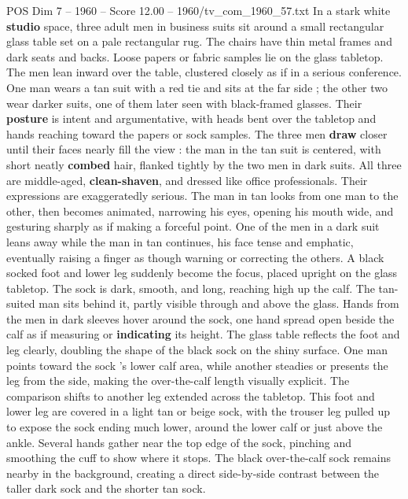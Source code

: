 \begin{textsample}{POS Dim 7 – 1960 – Score 12.00 – 1960/tv\_com\_1960\_57.txt}  \label{ex:f7_pos_026}
In a stark white \textbf{studio} space, three adult men in business suits sit around a small rectangular glass table set on a pale rectangular rug.
The chairs have thin metal frames and dark seats and backs.
Loose papers or fabric samples lie on the glass tabletop.
The men lean inward over the table, clustered closely as if in a serious conference.
One man wears a tan suit with a red tie and sits at the far side ; the other two wear darker suits, one of them later seen with black-framed glasses.
Their \textbf{posture} is intent and argumentative, with heads bent over the tabletop and hands reaching toward the papers or sock samples.
The three men \textbf{draw} closer until their faces nearly fill the view : the man in the tan suit is centered, with short neatly \textbf{combed} hair, flanked tightly by the two men in dark suits.
All three are middle-aged, \textbf{clean-shaven}, and dressed like office professionals.
Their expressions are exaggeratedly serious.
The man in tan looks from one man to the other, then becomes animated, narrowing his eyes, opening his mouth wide, and gesturing sharply as if making a forceful point.
One of the men in a dark suit leans away while the man in tan continues, his face tense and emphatic, eventually raising a finger as though warning or correcting the others.
A black socked foot and lower leg suddenly become the focus, placed upright on the glass tabletop.
The sock is dark, smooth, and long, reaching high up the calf.
The tan-suited man sits behind it, partly visible through and above the glass.
Hands from the men in dark sleeves hover around the sock, one hand spread open beside the calf as if measuring or \textbf{indicating} its height.
The glass table reflects the foot and leg clearly, doubling the shape of the black sock on the shiny surface.
One man points toward the sock ’s lower calf area, while another steadies or presents the leg from the side, making the over-the-calf length visually explicit.
The comparison shifts to another leg extended across the tabletop.
This foot and lower leg are covered in a light tan or beige sock, with the trouser leg pulled up to expose the sock ending much lower, around the lower calf or just above the ankle.
Several hands gather near the top edge of the sock, pinching and smoothing the cuff to show where it stops.
The black over-the-calf sock remains nearby in the background, creating a direct side-by-side contrast between the taller dark sock and the shorter tan sock.

\end{textsample}
